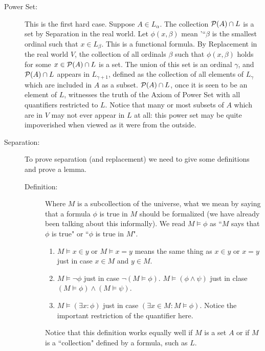 \documentclass[12pt]{book}
\begin{document}
\begin{description}
\item[Power Set:]  This is the first hard case.  Suppose $A \in L_{\alpha}$.  The collection ${\cal P}(A) \cap L$ is a set by Separation in the real world.  Let $\phi(x,\beta)$ mean
'``$\beta$ is the smallest ordinal such that $x \in L_{\beta}$.  This is a functional formula.  By Replacement in the real world $V$, the collection of all ordinals $\beta$ such
that $\phi(x,\beta)$ holds for some $x \in {\cal P}(A) \cap L$ is a set.  The union of this set is an ordinal $\gamma$, and ${\cal P}(A) \cap L$ appears in $L_{\gamma+1}$, defined
as the collection of all elements of $L_{\gamma}$ which are included in $A$ as a subset.  ${\cal P}(A) \cap L$, once it is seen to be an element of $L$, witnesses the truth of the Axiom of Power Set with all quantifiers restricted to $L$.  Notice that many or most subsets of $A$ which are in $V$ may not ever appear in $L$ at all:  this power set may be quite impoverished when viewed as it were from the outside.

\item[Separation:]  To prove separation (and replacement) we need to give some definitions and prove a lemma.

\begin{description}

\item[Definition:]  Where $M$ is a subcollection of the universe, what we mean by saying that a formula $\phi$ is true in $M$ should be formalized (we have already been talking about this informally).  We read $M \models \phi$ as ``$M$ says that $\phi$ is true" or ``$\phi$ is true in $M$".

\begin{enumerate}

\item $M \models x \in y$ or $M \models x=y$ means the same thing as $x \in y$ or $x=y$ just in case $x \in M$ and $y \in M$.

\item $M \models \neg \phi$ just in case $\neg(M \models \phi)$.  $M \models (\phi \wedge \psi)$ just in clase $(M \models \phi) \wedge (M \models \psi)$.

\item $M \models (\exists x:\phi)$ just in case $(\exists x \in M:M \models \phi)$.  Notice the important restriction of the quantifier here.

\end{enumerate}

Notice that this definition works equally well if $M$ is a set $A$ or if $M$ is a ``collection" defined by a formula, such as $L$.


\end{description}
\end{description}
\end{document}
